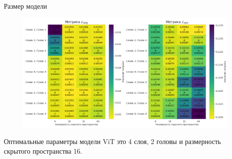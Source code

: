 \documentclass[9pt]{beamer}
\begin{document}
\begin{frame}{Размер модели}
    \begin{figure}
        \centering
        \includegraphics[width=1\textwidth]{../report/graphics/exp4_model_params_std.png}
    \end{figure}

    \begin{block}{}
        Оптимальные параметры модели ViT это 4 слоя, 2 головы и размерность скрытого пространства 16.
    \end{block}
\end{frame}
\end{document}
